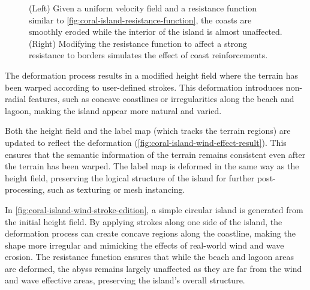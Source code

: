 \begin{figure}
    \caption{(Left) Given a uniform velocity field and a resistance function similar to \cref{fig:coral-island-resistance-function}, the coasts are smoothly eroded while the interior of the island is almost unaffected. (Right) Modifying the resistance function to affect a strong resistance to borders simulates the effect of coast reinforcements.}
    \label{fig:coral-island-strong-low-resistance}
\end{figure}


The deformation process results in a modified height field where the terrain has been warped according to user-defined strokes. This deformation introduces non-radial features, such as concave coastlines or irregularities along the beach and lagoon, making the island appear more natural and varied.

Both the height field and the label map (which tracks the terrain regions) are updated to reflect the deformation (\cref{fig:coral-island-wind-effect-result}). This ensures that the semantic information of the terrain remains consistent even after the terrain has been warped. The label map is deformed in the same way as the height field, preserving the logical structure of the island for further post-processing, such as texturing or mesh instancing.

In \cref{fig:coral-island-wind-stroke-edition}, a simple circular island is generated from the initial height field. By applying strokes along one side of the island, the deformation process can create concave regions along the coastline, making the shape more irregular and mimicking the effects of real-world wind and wave erosion. The resistance function ensures that while the beach and lagoon areas are deformed, the abyss remains largely unaffected as they are far from the wind and wave effective areas, preserving the island's overall structure.

